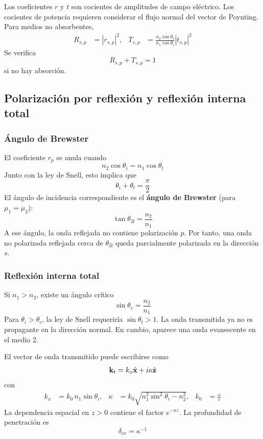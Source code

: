 \documentclass[]{article}
\numberwithin{equation}{section}
\begin{document}
Los coeficientes $r$ y $t$ son cocientes de amplitudes de campo eléctrico. Los cocientes de potencia requieren considerar el flujo normal del vector de Poynting. Para medios no absorbentes,
\begin{align}
	R_{s,p} &= |r_{s,p}|^2, & T_{s,p} &= \frac{n_2 \cos\theta_{t}}{n_1\cos\theta_{i}} |t_{s,p}|^2
\end{align}
Se verifica
\begin{equation}
	R_{s,p} + T_{s,p} = 1
\end{equation}
si no hay absorción.

\subsection{Polarización por reflexión y reflexión interna total}
\subsubsection{Ángulo de Brewster}
El coeficiente $r_p$ se anula cuando
\begin{equation}
	n_2 \cos\theta_{i} = n_1 \cos\theta_{t}
\end{equation}
Junto con la ley de Snell, esto implica que
\begin{equation}
	\theta_{i} + \theta_{t} = \frac{\pi}{2}
\end{equation}
El ángulo de incidencia correspondiente es el \textbf{ángulo de Brewster} (para $\mu_1 = \mu_2$):
\begin{equation}
	\tan\theta_B = \frac{n_2}{n_1}
\end{equation}
A ese ángulo, la onda reflejada no contiene polarización $p$. Por tanto, una onda no polarizada reflejada cerca de $\theta_B$ queda parcialmente polarizada en la dirección $s$.

\subsubsection{Reflexión interna total}
Si $n_1 > n_2$, existe un ángulo crítico
\begin{equation}
	\sin\theta_c = \frac{n_2}{n_1}
\end{equation}
Para $\theta_{i} > \theta_c$, la ley de Snell requeriría $\sin\theta_{t} > 1$. La onda transmitida ya no es propagante en la dirección normal. En cambio, aparece una onda evanescente en el medio 2.

El vector de onda transmitido puede escribirse como
\begin{equation}
	\mathbf{k}_t = k_x \hat{\mathbf{x}} + i \kappa \hat{\mathbf{z}}
\end{equation}
con
\begin{align}
	k_x &= k_0 \, n_1 \sin\theta_{i}, & \kappa &= k_0 \sqrt{n_1^2 \sin^2\theta_{i} - n_2^2}, & k_0 &= \frac{\omega}{c}
\end{align}
La dependencia espacial en $z > 0$ contiene el factor $e^{-\kappa z}$. La profundidad de penetración es
\begin{equation}
	\delta_\mathrm{ev} = \kappa^{-1}
\end{equation}
\end{document}
